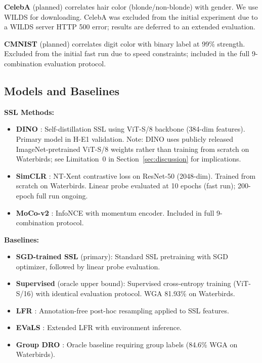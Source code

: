 \textbf{CelebA} \citep{liu2015celeba} (planned) correlates hair color (blonde/non-blonde) with gender. We use WILDS \citep{koh2021wilds} for downloading. CelebA was excluded from the initial experiment due to a WILDS server HTTP 500 error; results are deferred to an extended evaluation.

\textbf{CMNIST} \citep{arjovsky2019irm} (planned) correlates digit color with binary label at 99\% strength. Excluded from the initial fast run due to speed constraints; included in the full 9-combination evaluation protocol.

\subsection{Models and Baselines}

\textbf{SSL Methods:}
\begin{itemize}
    \item \textbf{DINO} \citep{caron2021dino}: Self-distillation SSL using ViT-S/8 backbone (384-dim features). Primary model in H-E1 validation. Note: DINO uses publicly released ImageNet-pretrained ViT-S/8 weights rather than training from scratch on Waterbirds; see Limitation~0 in Section~\ref{sec:discussion} for implications.
    \item \textbf{SimCLR} \citep{chen2020simclr}: NT-Xent contrastive loss on ResNet-50 (2048-dim). Trained from scratch on Waterbirds. Linear probe evaluated at 10 epochs (fast run); 200-epoch full run ongoing.
    \item \textbf{MoCo-v2} \citep{chen2020mocov2}: InfoNCE with momentum encoder. Included in full 9-combination protocol.
\end{itemize}

\textbf{Baselines:}
\begin{itemize}
    \item \textbf{SGD-trained SSL} (primary): Standard SSL pretraining with SGD optimizer, followed by linear probe evaluation.
    \item \textbf{Supervised} (oracle upper bound): Supervised cross-entropy training (ViT-S/16) with identical evaluation protocol. WGA 81.93\% on Waterbirds.
    \item \textbf{LFR} \citep{ghaznavi2023lfr}: Annotation-free post-hoc resampling applied to SSL features.
    \item \textbf{EVaLS} \citep{ghaznavi2024evals}: Extended LFR with environment inference.
    \item \textbf{Group DRO} \citep{sagawa2019dro}: Oracle baseline requiring group labels (84.6\% WGA on Waterbirds).
\end{itemize}

